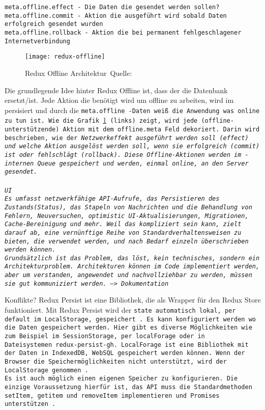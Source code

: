 \tt{meta.offline.effect} - Die Daten die gesendet werden sollen?\\
\tt{meta.offline.commit} - Aktion die ausgeführt wird sobald Daten erfolgreich gesendet wurden\\
\tt{meta.offline.rollback} - Aktion die bei permanent fehlgeschlagener Internetverbindung
~\cite{redux-offline-gh}
%
\begin{figure}[H]
  \centering
  \texttt{[image: redux-offline]}
  \grayRule
  \caption[Redux Offline]{Redux Offline Architektur~Quelle:~\cite{redux-offline}}
  \label{fig:redux-offline}
\end{figure}
%
Die grundlegende Idee hinter Redux Offline ist, dass der  die Datenbank ersetzt/ist. Jede Aktion die benötigt wird um offline zu arbeiten, wird im  persisiert und durch die \tt{meta.offline} -Daten weiß die Anwendung was online zu tun ist. Wie die Grafik \ref{fig:redux-offline} (links) zeigt, wird jede (offline-unterstützende) Aktion mit dem \tt{offline.meta} Feld dekoriert. Darin wird beschrieben, wie der \it{Netzwerkeffekt} ausgeführt werden soll (\tt{effect}) und welche Aktion ausgelöst werden soll, wenn sie erfolgreich (\tt{commit}) ist oder fehlschlägt (\tt{rollback}). Diese Offline-Aktionen werden im -internen \gls{Queue} gespeichert und werden, einmal online, an den Server gesendet.\\\\
\gls{UI}\\
Es umfasst netzwerkfähige \gls{API}-Aufrufe, das Persistieren des Zustands(Status), das Stapeln von Nachrichten und die Behandlung von Fehlern, Neuversuchen, \gls{optimistic UI}-Aktualisierungen, Migrationen, Cache-Bereinigung und mehr.
Weil das kompliziert sein kann, zielt  darauf ab, eine vernünftige Reihe von Standardverhaltensweisen zu bieten, die verwendet werden, und nach Bedarf einzeln überschrieben werden können.\\
Grundsätzlich ist das Problem, das  löst, kein technisches, sondern ein Architekturproblem. Architekturen können im Code implementiert werden, aber um verstanden, angewendet und nachvollziehbar zu werden, müssen sie gut kommuniziert werden. --> Dokumentation

{\large Konflikte?}
%
%
Redux Persist ist eine Bibliothek, die als Wrapper für den Redux Store funktioniert. Mit Redux Persist wird der \tt{state} automatisch lokal, per default im LocalStorage, gespeichert~\cite{redux-persist}.
Es kann konfiguriert werden wo die Daten gespeichert werden. Hier gibt es diverse Möglichkeiten wie zum Beispiel im SessionStorage, per localForage oder in Dateisystemen~{redux-persist-gh}. LocalForage ist eine Bibliothek mit der Daten in IndexedDB, WebSQL gespeichert werden können. Wenn der Browser die Speichermöglichkeiten nicht unterstützt, wird der LocalStorage genommen~\cite{localforage}.\\
Es ist auch möglich einen eigenen Speicher zu konfigurieren. Die einzige Voraussetzung hierfür ist, das \gls{API} muss die Standardmethoden \tt{setItem}, \tt{getitem} und \tt{removeItem} implementieren und Promises unterstützen~\cite{redux-persist-gh}.
%
%
